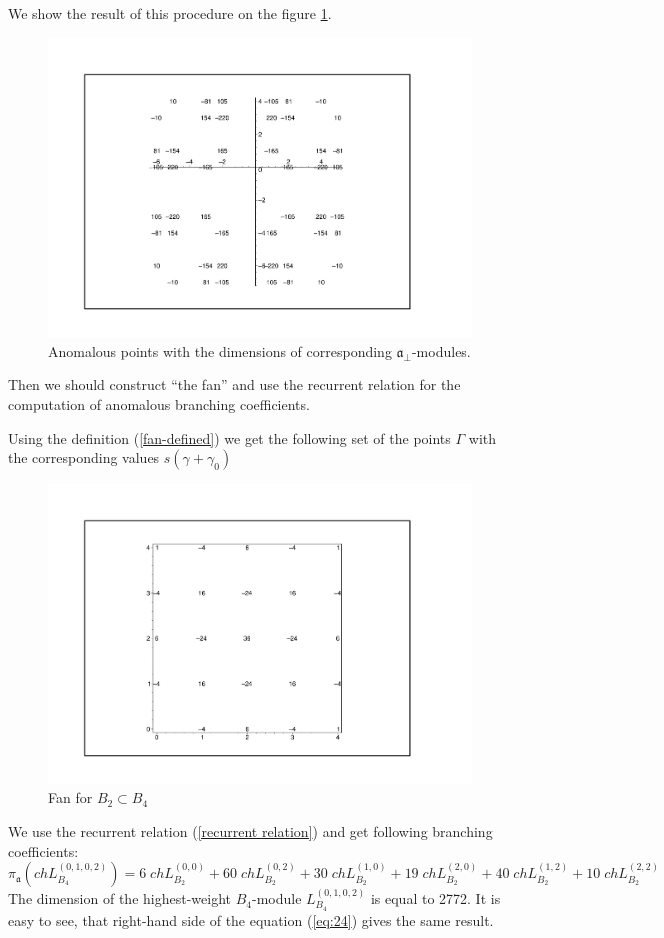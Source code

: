 \documentclass[a4paper,12pt]{article}
\theoremstyle{definition} \newtheorem{Def}{Definition}
\begin{document}
We show the result of this procedure on the figure \ref{fig:B4B2anom}.
\begin{figure}[ph]
    \includegraphics[width=170mm]{B4_B2_anom_points.pdf}
  \caption{Anomalous points with the dimensions of corresponding $\mathfrak{a}_{\bot}$-modules.}
  \label{fig:B4B2anom}
\end{figure}

Then we should construct ``the fan'' and use the recurrent relation for the computation of anomalous branching coefficients.

Using the definition (\ref{fan-defined}) we get the following set of
the points $\Gamma$ with the corresponding values $s(\gamma+\gamma_0)$
\begin{figure}[ph]
  \includegraphics[width=150mm]{B4_B2_fan.pdf}
  \caption{Fan for $B_2\subset B_4$}
  \label{fig:B4B2Fan}
\end{figure}
We use the recurrent relation (\ref{recurrent relation}) and get
following branching coefficients:
\begin{equation}
  \label{eq:24}
  \pi_{\mathfrak{a}} \left(ch L^{(0,1,0,2)}_{B_4}\right) = 6 \; ch L^{(0,0)}_{B_2}+ 60
  \; ch L_{B_2}^{(0,2)}+ 30 \; ch L_{B_2}^{(1,0)}+ 19 \; ch L_{B_2}^{(2,0)}+
  40 \; ch L_{B_2}^{(1,2)}+ 10 \; ch L_{B_2}^{(2,2)}
\end{equation}
The dimension of the highest-weight $B_4$-module $L^{(0,1,0,2)}_{B_4}$
is equal to 2772. It is easy to see, that right-hand side of the
equation (\ref{eq:24}) gives the same result.
\end{document}
